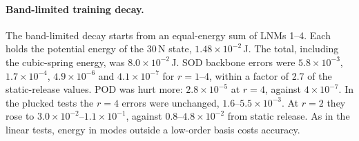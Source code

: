 \documentclass[11pt]{article}
\begin{document}
\paragraph{Band-limited training decay.} The band-limited decay starts from an equal-energy sum of LNMs 1--4. Each holds the potential energy of the 30\,N state, $1.48\times10^{-2}$\,J. The total, including the cubic-spring energy, was $8.0\times10^{-2}$\,J.
SOD backbone errors were $5.8\times10^{-3}$, $1.7\times10^{-4}$, $4.9\times10^{-6}$ and $4.1\times10^{-7}$ for $r=1$--4, within a factor of 2.7 of the static-release values. POD was hurt more: $2.8\times10^{-5}$ at $r=4$, against $4\times10^{-7}$.
In the plucked tests the $r=4$ errors were unchanged, $1.6$--$5.5\times10^{-3}$. At $r=2$ they rose to $3.0\times10^{-2}$--$1.1\times10^{-1}$, against $0.8$--$4.8\times10^{-2}$ from static release. As in the linear tests, energy in modes outside a low-order basis costs accuracy.
\end{document}
